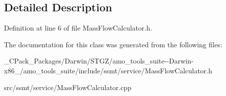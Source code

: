 \subsection{Detailed Description}


Definition at line 6 of file Mass\+Flow\+Calculator.\+h.



The documentation for this class was generated from the following files\+:\begin{DoxyCompactItemize}
\item 
\+\_\+\+C\+Pack\+\_\+\+Packages/\+Darwin/\+S\+T\+G\+Z/amo\+\_\+tools\+\_\+suite-\/-\/\+Darwin-\/x86\+\_/amo\+\_\+tools\+\_\+suite/include/ssmt/service/Mass\+Flow\+Calculator.\+h\item 
src/ssmt/service/Mass\+Flow\+Calculator.\+cpp\end{DoxyCompactItemize}
